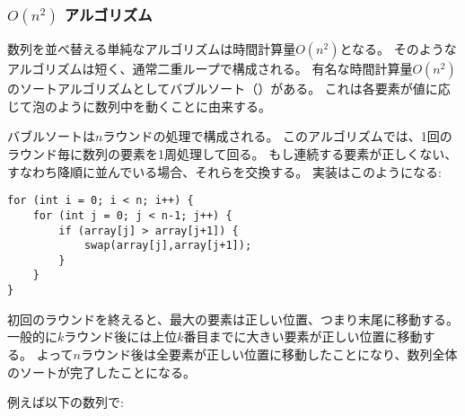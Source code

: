 \subsubsection{$O(n^2)$ アルゴリズム}


数列を並べ替える単純なアルゴリズムは時間計算量$O(n^2)$となる。
そのようなアルゴリズムは短く、通常二重ループで構成される。
有名な時間計算量$O(n^2)$のソートアルゴリズムとしてバブルソート（）がある。
これは各要素が値に応じて泡のように数列中を動くことに由来する。

バブルソートは$n$ラウンドの処理で構成される。
このアルゴリズムでは、1回のラウンド毎に数列の要素を1周処理して回る。
もし連続する要素が正しくない、すなわち降順に並んでいる場合、それらを交換する。
実装はこのようになる:
\begin{lstlisting}
for (int i = 0; i < n; i++) {
    for (int j = 0; j < n-1; j++) {
        if (array[j] > array[j+1]) {
            swap(array[j],array[j+1]);
        }
    }
}
\end{lstlisting}

\begin{comment}
After the first round of the algorithm,
the largest element will be in the correct position,
and in general, after $k$ rounds, the $k$ largest
elements will be in the correct positions.
Thus, after $n$ rounds, the whole array
will be sorted.

For example, in the array
\end{comment}

初回のラウンドを終えると、最大の要素は正しい位置、つまり末尾に移動する。
一般的に$k$ラウンド後には上位$k$番目までに大きい要素が正しい位置に移動する。
よって$n$ラウンド後は全要素が正しい位置に移動したことになり、数列全体のソートが完了したことになる。

例えば以下の数列で:

\begin{center}
\end{center}

\noindent

\begin{comment}
the first round of bubble sort swaps elements
as follows:
\end{comment}

